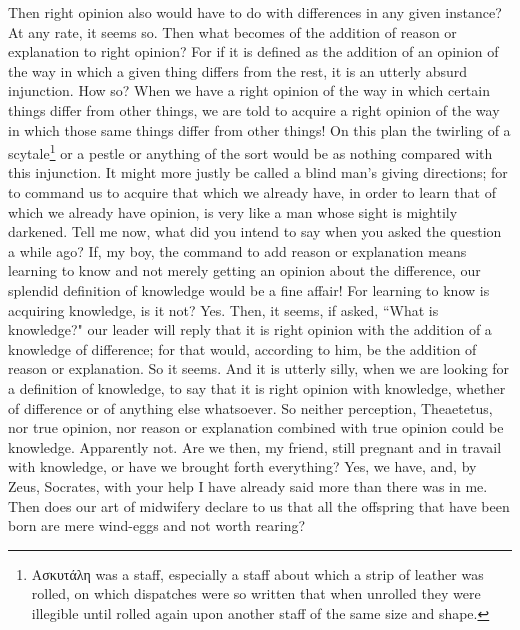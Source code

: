 \documentclass[letterpaper,12pt]{article}
\newcommand{\textgreek}[1]{\begingroup\fontencoding{LGR}\selectfont#1\endgroup}
\newcommand{\stephpag}[1]{\marginnote{\small\itshape\fontfamily{ppl}\selectfont #1}}
\begin{document}
\begin{drama}
\socratesspeaks
Then right opinion also would have to do with differences in any given instance?
\theaetetusspeaks
At any rate, it seems so.
\socratesspeaks
Then what becomes of the addition of reason or explanation to right opinion? For if it is defined as the addition of an opinion of the way in which a given thing differs from the rest, it is an utterly absurd injunction.
\theaetetusspeaks
How so?
\socratesspeaks
When we have a right opinion of the way in which certain things differ from other things, we are told to acquire a right opinion of the way in which those same things differ from other things! On this plan the twirling of a scytale\footnote{\textgreek{Aσκυτάλη} was a staff, especially a staff about which a strip of leather was rolled, on which dispatches were so written that when unrolled they were illegible until rolled again upon another staff of the same size and shape.} or a pestle or anything of the sort would be as nothing \stephpag{e} compared with this injunction. It might more justly be called a blind man's giving directions; for to command us to acquire that which we already have, in order to learn that of which we already have opinion, is very like a man whose sight is mightily darkened.
\theaetetusspeaks
Tell me now, what did you intend to say when you asked the question a while ago?
\socratesspeaks
If, my boy, the command to add reason or explanation means learning to know and not merely getting an opinion about the difference, our splendid definition of knowledge would be a fine affair! For learning to know is acquiring knowledge, \stephpag{210 a} is it not?
\theaetetusspeaks
Yes.
\socratesspeaks
Then, it seems, if asked, ``What is knowledge?" our leader will reply that it is right opinion with the addition of a knowledge of difference; for that would, according to him, be the addition of reason or explanation.
\theaetetusspeaks
So it seems.
\socratesspeaks
And it is utterly silly, when we are looking for a definition of knowledge, to say that it is right opinion with knowledge, whether of difference or of anything else whatsoever. So neither perception, Theaetetus, nor true opinion, nor reason or explanation \stephpag{b} combined with true opinion could be knowledge.
\theaetetusspeaks
Apparently not.
\socratesspeaks
Are we then, my friend, still pregnant and in travail with knowledge, or have we brought forth everything?
\theaetetusspeaks
Yes, we have, and, by Zeus, Socrates, with your help I have already said more than there was in me.
\socratesspeaks
Then does our art of midwifery declare to us that all the offspring that have been born are mere wind-eggs and not worth rearing?

\end{drama}
\end{document}
